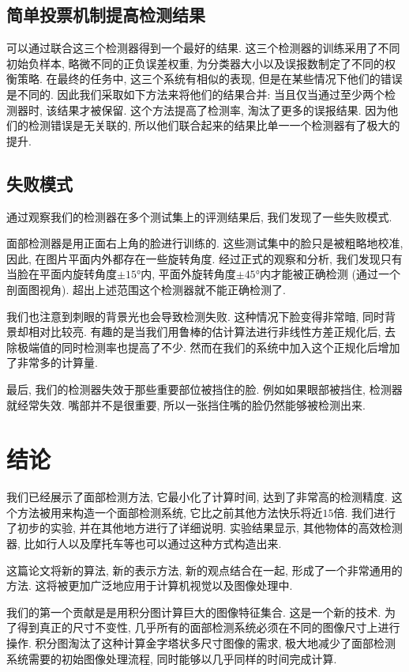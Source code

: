 \documentclass[a4paper,utf8,11pt, onecolumn]{ctexart}
\begin{document}
\subsection{简单投票机制提高检测结果}
可以通过联合这三个检测器得到一个最好的结果. 这三个检测器的训练采用了不同初始负样本, 略微不同的正负误差权重, 为分类器大小以及误报数制定了不同的权衡策略. 在最终的任务中, 这三个系统有相似的表现, 但是在某些情况下他们的错误是不同的. 因此我们采取如下方法来将他们的结果合并: 当且仅当通过至少两个检测器时, 该结果才被保留. 这个方法提高了检测率, 淘汰了更多的误报结果. 因为他们的检测错误是无关联的, 所以他们联合起来的结果比单一一个检测器有了极大的提升.

\subsection{失败模式}
通过观察我们的检测器在多个测试集上的评测结果后, 我们发现了一些失败模式.

面部检测器是用正面右上角的脸进行训练的. 这些测试集中的脸只是被粗略地校准, 因此, 在图片平面内外都存在一些旋转角度. 经过正式的观察和分析, 我们发现只有当脸在平面内旋转角度$\pm\ang{15}$内, 平面外旋转角度$\pm\ang{45}$内才能被正确检测 (通过一个剖面图视角). 超出上述范围这个检测器就不能正确检测了.

我们也注意到刺眼的背景光也会导致检测失败. 这种情况下脸变得非常暗, 同时背景却相对比较亮. 有趣的是当我们用鲁棒的估计算法进行非线性方差正规化后, 去除极端值的同时检测率也提高了不少. 然而在我们的系统中加入这个正规化后增加了非常多的计算量.

最后, 我们的检测器失效于那些重要部位被挡住的脸. 例如如果眼部被挡住, 检测器就经常失效. 嘴部并不是很重要, 所以一张挡住嘴的脸仍然能够被检测出来.

\section{结论}\label{sec:discussion}
我们已经展示了面部检测方法, 它最小化了计算时间, 达到了非常高的检测精度. 这个方法被用来构造一个面部检测系统, 它比之前其他方法快乐将近$15$倍. 我们进行了初步的实验, 并在其他地方进行了详细说明. 实验结果显示, 其他物体的高效检测器, 比如行人以及摩托车等也可以通过这种方式构造出来.

这篇论文将新的算法, 新的表示方法, 新的观点结合在一起, 形成了一个非常通用的方法. 这将被更加广泛地应用于计算机视觉以及图像处理中.

我们的第一个贡献是是用积分图计算巨大的图像特征集合. 这是一个新的技术. 为了得到真正的尺寸不变性, 几乎所有的面部检测系统必须在不同的图像尺寸上进行操作. 积分图淘汰了这种计算金字塔状多尺寸图像的需求, 极大地减少了面部检测系统需要的初始图像处理流程, 同时能够以几乎同样的时间完成计算.
\end{document}
